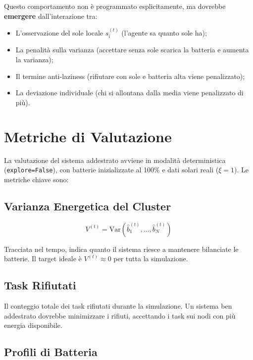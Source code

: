 \documentclass[11pt,a4paper]{article}
\begin{document}
Questo comportamento non \`e programmato esplicitamente, ma dovrebbe \textbf{emergere} dall'interazione tra:
\begin{itemize}[nosep]
    \item L'osservazione del sole locale $s_i^{(t)}$ (l'agente sa quanto sole ha);
    \item La penalità sulla varianza (accettare senza sole scarica la batteria e aumenta la varianza);
    \item Il termine anti-laziness (rifiutare con sole e batteria alta viene penalizzato);
    \item La deviazione individuale (chi si allontana dalla media viene penalizzato di pi\`u).
\end{itemize}

\section{Metriche di Valutazione}

La valutazione del sistema addestrato avviene in modalit\`a deterministica (\texttt{explore=False}), con batterie inizializzate al 100\% e dati solari reali ($\xi = 1$). Le metriche chiave sono:

\subsection{Varianza Energetica del Cluster}

\begin{equation}
V^{(t)} = \text{Var}\!\left(\hat{b}_1^{(t)}, \ldots, \hat{b}_N^{(t)}\right)
\end{equation}

Tracciata nel tempo, indica quanto il sistema riesce a mantenere bilanciate le batterie. Il target ideale \`e $V^{(t)} \approx 0$ per tutta la simulazione.

\subsection{Task Rifiutati}

Il conteggio totale dei task rifiutati durante la simulazione. Un sistema ben addestrato dovrebbe minimizzare i rifiuti, accettando i task sui nodi con pi\`u energia disponibile.

\subsection{Profili di Batteria}
\end{document}
